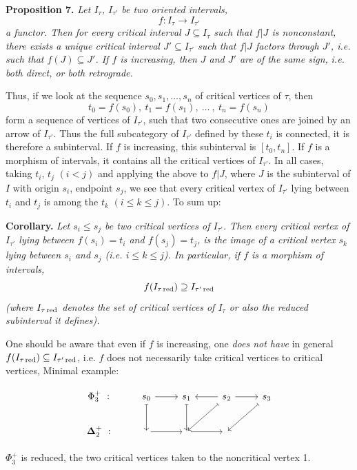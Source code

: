 \documentclass[11pt]{article}
\newcommand{\printedpage}[1]{\marginpar{\footnotesize p.~#1}}
\newcommand{\msp}[1]{\marginpar{\footnotesize [#1]}}
\newcommand{\bDelta}{\boldsymbol{\Delta}}
\newcommand{\red}{\text{\upshape red}}
\begin{document}
\textbf{Proposition 7.} \textit{Let $I_\tau$, $I_{\tau'}$ be two oriented intervals,}
\[
f : I_\tau\longrightarrow I_{\tau'}
\]
\textit{a functor. Then for every critical interval $J\subseteq I_\tau$ such that $f|J$ is nonconstant, there exists a unique critical interval $J'\subseteq I_{\tau'}$ such that $f|J$ factors through $J'$, i.e. such that $f(J)\subseteq J'$. If $f$ is increasing, then $J$ and $J'$ are of the same sign,}
\msp{page 34}
\textit{i.e. both direct, or both retrograde.}

Thus, if we look at the sequence $s_0,s_1,\ldots,s_n$ of critical vertices of $\tau$, then
\[
t_0=f(s_0),\ t_1=f(s_1),\ \ldots\ ,\ t_n=f(s_n)
\]
form a sequence of vertices of $I_{\tau'}$, such that two consecutive ones are joined by an arrow of $I_{\tau'}$. Thus the full subcategory of $I_{\tau'}$ defined by these $t_i$ is connected, it is therefore a subinterval. If $f$ is increasing, this subinterval is $[t_0,t_n]$. If $f$ is a morphism of intervals, it contains all the critical vertices of $I_{\tau'}$. In all cases, taking $t_i$, $t_j$ $(i<j)$ and applying the above to $f|J$, where $J$ is the subinterval of $I$ with origin $s_i$, endpoint $s_j$, we see that every critical vertex of $I_{\tau'}$ lying between $t_i$ and $t_j$ is among the $t_k$ $(i\leq k\leq j)$. To sum up:

\textbf{Corollary.} \textit{Let $s_i\leq s_j$ be two critical vertices of $I_{\tau'}$. Then every critical vertex of $I_{\tau'}$ lying between $f(s_i)=t_i$ and $f(s_j)=t_j$, is the image of a critical vertex $s_k$ lying between $s_i$ and $s_j$ (i.e. $i\leq k\leq j$). In particular, if $f$ is a morphism of intervals,} %
\[
f(I_{\tau\,\red})\supseteq I_{\tau'\,\red}
\]
\textit{(where $I_{\tau\,\red}$ denotes the set of critical vertices of $I_\tau$ or also the reduced subinterval it defines).}

\msp{page 35}
One should be aware that even if $f$ is increasing, one \textit{does not have} in general $f(I_{\tau\,\red})\subseteq I_{\tau'\,\red}$, i.e. $f$ does not necessarily take critical vertices to critical vertices, Minimal example:
\printedpage{23}

\noindent
\begin{minipage}[c]{0.6\textwidth}
\[
\begin{tikzcd}
\Phi_3^+\ : & s_0 \arrow[r] \arrow[d, mapsto] & s_1 \arrow[d, mapsto] & s_2 \arrow[l] \arrow[r] \arrow[dl, mapsto] & s_3 \arrow[dl, mapsto] \\
\bDelta_2^+\ : & {} \arrow[r] & {} \arrow[r] & {} &
\end{tikzcd}
\]
\end{minipage}\hfill
\begin{minipage}[c]{0.35\textwidth}
$\Phi_3^+$ is reduced, the two critical vertices taken to the noncritical vertex 1.
\end{minipage}
\end{document}
